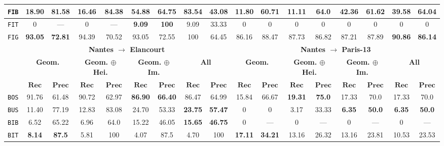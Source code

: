 \begin{sidewaystable}[htbp]
\begin{tabular}{|c | c c | c c | c c | c c || c c | c c | c c | c c |}
                \hline
                \texttt{FIB} & 18.90 & 81.58 & 16.46 & 84.38 & \textbf{54.88} & \textbf{64.75} & 83.54 & 43.08 & 11.80 & 60.71 & 11.11 & 64.0 & \textbf{42.36} & \textbf{61.62} & 39.58 & 64.04 \\ 
                \hline
                \texttt{FIT} & 0 & --- & 0 & --- & \textbf{9.09} & \textbf{100} & 9.09 & 33.33 & 0 & 0 & 0 & 0 & 0 & 0 & 0 & 0 \\
                \hline
                \texttt{FIG} & \textbf{93.05} & \textbf{72.81} & 94.39 & 70.52 & 93.05 & 72.55 & 100 & 64.45 & 86.16 & 88.47 & 87.73 & 86.82 & 87.21 & 87.89 & \textbf{90.86} & \textbf{86.14} \\
                \hline
                \hline
                & \multicolumn{8}{c||}{\textbf{Nantes \(\rightarrow\) Elancourt}} & \multicolumn{8}{c|}{\textbf{Nantes \(\rightarrow\) Paris-13}}\\
                \hline
                &\multicolumn{2}{c|}{\textbf{Geom.}} & \multicolumn{2}{c|}{\textbf{Geom. \(\oplus\) Hei.}} & \multicolumn{2}{c|}{\textbf{Geom. \(\oplus\) Im.}} & \multicolumn{2}{c||}{\textbf{All}} & \multicolumn{2}{c|}{\textbf{Geom.}} & \multicolumn{2}{c|}{\textbf{Geom. \(\oplus\) Hei.}} & \multicolumn{2}{c|}{\textbf{Geom. \(\oplus\) Im.}} & \multicolumn{2}{x{1.5cm}|}{\textbf{All}}\\
                \cline{2-17}
                & \(\bm{Rec}\) & \(\bm{Prec}\) &  \(\bm{Rec}\) & \(\bm{Prec}\) &  \(\bm{Rec}\) & \(\bm{Prec}\) &  \(\bm{Rec}\) & \(\bm{Prec}\) & \(\bm{Rec}\) & \(\bm{Prec}\) &  \(\bm{Rec}\) & \(\bm{Prec}\) &  \(\bm{Rec}\) & \(\bm{Prec}\) &  \(\bm{Rec}\) & \(\bm{Prec}\) \\
                \hline
                \texttt{BOS} & 91.76 & 61.48 & 90.72 & 62.97 & \textbf{86.90} & \textbf{66.40} & 86.47 & 64.99 & 15.84 & 66.67 & \textbf{19.31} & \textbf{75.0} & 17.33 & 70.0 & 17.33 & 70.0 \\
                \hline
                \texttt{BUS} & 11.40 & 77.19 & 12.83 & 83.08 & 24.70 & 53.33 & \textbf{23.75} & \textbf{57.47} & 0 & 0 & 3.17 & 33.33 & \textbf{6.35} & \textbf{50.0} & \textbf{6.35} & \textbf{50.0} \\
                \hline
                \texttt{BIB} & 6.52 & 65.22 & 6.96 & 64.0 & 15.22 & 46.05 & \textbf{15.65} & \textbf{46.75} & 0 & --- & 0 & --- & 0 & --- & 0 & --- \\
                \hline
                \texttt{BIT} & \textbf{8.14} & \textbf{87.5} & 5.81 & 100 & 4.07 & 87.5 & 4.70 & 100 & \textbf{17.11} & \textbf{34.21} & 13.16 & 26.32 & 13.16 & 23.81 & 10.53 & 23.53 \\

\end{tabular}
\end{sidewaystable}
